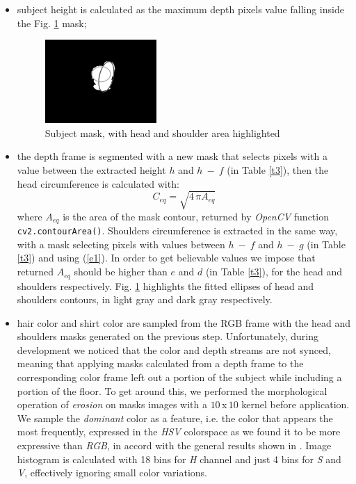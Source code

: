\documentclass[letterpaper, 11pt, conference]{ieeeconf} %
\begin{document}
\begin{itemize}
\item{subject height is calculated as the maximum depth pixels value falling inside the Fig. \ref{f3} mask;
\begin{figure}[t]
	\begin{flushright}
		\includegraphics[width=0.4\textwidth]{Mask.png}
		\caption{Subject mask, with head and shoulder area highlighted}
		\label{f3}
	\end{flushright}
\end{figure}}
\item{the depth frame is segmented with a new mask that selects pixels with a value between the extracted height $h$ and $h~-~f$ (in Table \ref{t3}), then the head circumference is calculated with:
\begin{equation}
C_{eq} = \sqrt{4\,\pi A_{eq}} \label{e1}
\end{equation}
where $A_{eq}$ is the area of the mask contour, returned by \emph{OpenCV} function \texttt{cv2.contourArea()}. Shoulders circumference is extracted in the same way, with a mask selecting pixels with values between $h~-~f$ and $h~-~g$ (in Table \ref{t3}) and using (\ref{e1}). In order to get believable values we impose that returned $A_{eq}$ should be higher than $e$ and $d$ (in Table \ref{t3}), for the head and shoulders respectively. Fig. \ref{f3} highlights the fitted ellipses of head and shoulders contours, in light gray and dark gray respectively.}
\item{hair color and shirt color are sampled from the RGB frame with the head and shoulders masks generated on the previous step. Unfortunately, during development we noticed that the color and depth streams are not synced, meaning that applying masks calculated from a depth frame to the corresponding color frame left out a portion of the subject while including a portion of the floor. To get around this, we performed the morphological operation of \emph{erosion} on masks images with a $10\,$x$\,10$ kernel before application. We sample the \emph{dominant} color\cite{c2} as a feature, i.e. the color that appears the most frequently, expressed in the \emph{HSV} colorspace as we found it to be more expressive than \emph{RGB}, in accord with the general results shown in \cite{c9}. Image histogram is calculated with 18 bins for \emph{H} channel and just 4 bins for \emph{S} and \emph{V}, effectively ignoring small color variations.}
\end{itemize}
\end{document}
